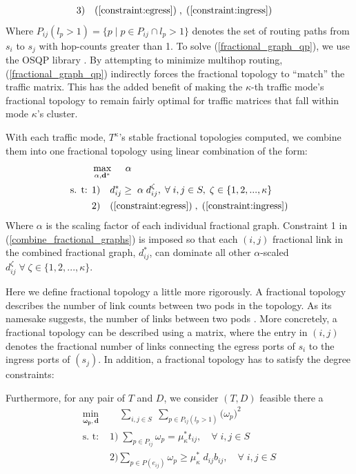 \documentclass[sigconf]{acmart}
\theoremstyle{definition}
\begin{document}
\begin{appendices}
\begin{equation}
\begin{aligned}
& 3) \quad (\ref{constraint:egress}) \; , \; (\ref{constraint:ingress})
\end{aligned}\label{fractional_graph_qp}
\end{equation}
Where $P_{ij}(l_p > 1) = \{p \; | \; p \in P_{ij} \cap l_p > 1\}$ denotes the set of routing paths from $s_i$ to $s_j$ with hop-counts greater than 1. To solve (\ref{fractional_graph_qp}), we use the OSQP library \cite{osqp}. By attempting to minimize multihop routing, (\ref{fractional_graph_qp}) indirectly forces the fractional topology to ``match'' the traffic matrix. This has the added benefit of making the $\kappa$-th traffic mode's fractional topology to remain fairly optimal for traffic matrices that fall within mode $\kappa$'s cluster.

With each traffic mode, $T^\kappa$'s stable fractional topologies computed, we combine them into one fractional topology using linear combination of the form:
\begin{equation}
\begin{aligned}
 & \max\limits_{\alpha, \mathbf{d}^*} \; \quad \alpha \\
 \text{s. t: } & 1) \quad d_{ij}^* \geq \; \alpha \; d_{ij}^\zeta, \; \forall \; i, j \in S, \; \zeta \in \{1, 2, ..., \kappa\} \\
  & 2) \quad (\ref{constraint:egress}) \;, \; (\ref{constraint:ingress})
\end{aligned}\label{combine_fractional_graphs}
\end{equation}
Where $\alpha$ is the scaling factor of each individual fractional graph. Constraint 1 in (\ref{combine_fractional_graphs}) is imposed so that each $(i, j)$ fractional link in the combined fractional graph, $d_{ij}^*$, can dominate all other $\alpha$-scaled $d_{ij}^\zeta \; \forall \; \zeta \in \{1,2, ..., \kappa\}$.

Here we define fractional topology a little more rigorously. A fractional topology describes the number of link counts between two pods in the topology. As its namesake suggests, the number of links between two pods . More concretely, a fractional topology can be described using a matrix, where the entry in $(i,j)$ denotes the fractional number of links connecting the egress ports of $s_i$ to the ingress ports of $(s_j)$. In addition, a fractional topology has to satisfy the degree constraints:

Furthermore, for any pair of $T$ and $D$, we consider $(T, D)$ feasible there a
\begin{equation}
\begin{aligned}
\min\limits_{\boldsymbol{\omega_p}, \mathbf{d}} \;& \quad \sum_{i, j \in S} \; \sum_{p \in P_{ij}(l_p > 1)}\big(\omega_{p}\big)^2 \\
\text{s. t: } & 1) \; \sum_{p \in P_{ij}} \omega_{p} = \mu_{\kappa}^* t_{ij}, \quad \forall \; i, j \in S \\
& 2) \sum\limits_{p \in P(e_{ij})} \omega_{p} \geq \mu_{\kappa}^* \; d_{ij} b_{ij}, \quad \forall \; i, j \in S\\
\end{aligned}\label{eqn:feasible_fg}
\end{equation}



\end{appendices}
\end{document}
